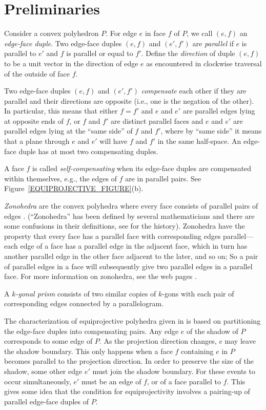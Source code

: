 \documentclass{article}
\begin{document}
\section{Preliminaries}

Consider a convex polyhedron $P$.
For edge $e$ in face $f$ of $P$, we call $(e,f)$ an {\it edge-face duple\/}.
Two edge-face duples $(e,f)$ and $(e',f')$ are {\it parallel\/}
if $e$ is parallel to $e'$ and $f$ is parallel or equal to $f'$.
Define the {\it direction\/} of duple $(e,f)$ to be
a unit vector in the direction of edge $e$ as encountered 
in clockwise traversal of the outside of face $f$.

Two edge-face duples $(e,f)$ and $(e',f')$ {\it compensate\/} each other if
they are parallel and 
their directions are opposite (i.e., one is the negation of the other).
In particular, this means that either $f = f'$ and $e$ and $e'$ are
parallel edges lying at opposite ends of $f$,
or $f$ and $f'$ are distinct parallel faces and $e$ and $e'$ are
parallel edges lying at the ``same side'' of $f$ and $f'$,
where by ``same side'' it means that a plane through $e$ and $e'$
will have $f$ and $f'$ in the same half-space. 
An edge-face duple has at most two compensating duples.

A face $f$ is called \emph{self-compensating} when its edge-face duples
are compensated within themselves, e.g., the edges of $f$ are in parallel pairs.
See Figure~\ref{EQUIPROJECTIVE_FIGURE}(b).

\emph{Zonohedra} are the convex polyhedra where every face 
consists of parallel pairs of edges \cite{Tay92}.
(``Zonohedra'' has been defined by several mathematicians 
and there are some confusions in their definitions, 
see \cite{Tay92} for the history).
Zonohedra have the property that every face has a parallel 
face with corresponding edges parallel---each edge of a face has a 
parallel edge in the adjacent face, which in turn has another parallel
edge in the other face adjacent to the later, and so on; 
So a pair of parallel edges in a face 
will subsequently give two parallel edges in a parallel face.
For more information on zonohedra, see the web pages \cite{Epp,Epp96,Har}.

A \emph{$k$-gonal prism} consists of two similar copies of $k$-gons with 
each pair of corresponding edges connected by a parallelogram.



The characterization of equiprojective polyhedra given in \cite{HL03} 
is based on partitioning the edge-face duples into compensating pairs.
Any edge $e$ of the shadow of $P$ corresponds to some edge of $P$.
As the projection direction changes, $e$ may leave the shadow 
boundary.  This only happens when a face $f$ containing $e$ 
in $P$ becomes parallel to the projection direction.  
In order to preserve the size of the shadow, some other edge
$e'$ must join the shadow boundary.  
For these events to occur simultaneously, $e'$ must
be an edge of $f$, or of a face parallel to $f$.
This gives some idea that the condition for equiprojectivity
involves a pairing-up of parallel edge-face duples of $P$.
\end{document}
